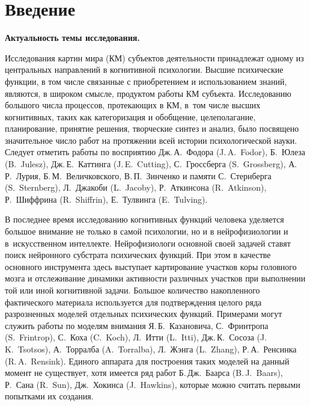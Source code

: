 \chapter*{Введение}							%
\textbf{Актуальность темы исследования.} 

Исследования картин мира (КМ) субъектов деятельности принадлежат одному из центральных направлений в когнитивной психологии. Высшие психические функции, в том числе связанные с приобретением и использованием знаний, являются, в широком смысле, продуктом работы КМ субъекта. Исследованию большого числа процессов, протекающих в КМ, в~том числе высших когнитивных, таких как категоризация и обобщение, целеполагание, планирование, принятие решения, творческие синтез и анализ, было посвящено значительное число работ на протяжении всей истории психологической науки. Следует отметить работы по восприятию Дж.\,А.~Фодора (J.\,A.~Fodor), Б.~Юлеза (B.~Julesz), Дж.\,Е.~Каттинга (J.\,E.~Cutting), С.~Гроссберга (S.~Grossberg), А.\,Р.~Лурия, Б.\,М.~Величковского, В.\,П.~Зинченко и памяти С.~Стернберга (S.~Sternberg), Л.~Джакоби (L.~Jacoby), Р.~Аткинсона (R.~Atkinson), Р.~Шиффрина (R.~Shiffrin), Е.~Тулвинга (E.~Tulving).

В последнее время исследованию когнитивных функций человека уделяется большое внимание не только в самой психологии, но и в нейрофизиологии и в~искусственном интеллекте. Нейрофизиологи основной своей задачей ставят поиск нейронного субстрата психических функций. При этом в качестве основного инструмента здесь выступает картирование участков коры головного мозга и отслеживание динамики активности различных участков при выполнении той или иной когнитивной задачи. Большое количество накопленного фактического материала используется для подтверждения целого ряда разрозненных моделей отдельных психических функций. Примерами могут служить работы по моделям внимания Я.\,Б.~Казановича, С.~Фринтропа (S.~Frintrop), С.~Коха (C.~Koch), Л.~Итти (L.~Itti), Дж.\,К.~Сосоза (J.\,K.~Tsotsos), А.~Торралба (A.~Torralba), Л.~Жэнга (L.~Zhang), Р.\,А.~Ренсинка (R.\,A.~Rensink). Единого аппарата для построения таких моделей на данный момент не существует, хотя имеется ряд работ Б.\,Дж.~Баарса (B.\,J.~Baars), Р.~Сана (R.~Sun), Дж.~Хокинса (J.~Hawkins), которые можно считать первыми попытками их создания.

